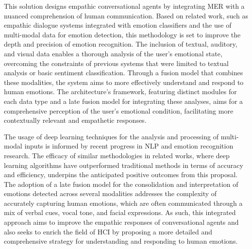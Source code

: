 \documentclass[runningheads]{llncs}
\begin{document}
This solution designs empathic conversational agents by integrating MER with a nuanced comprehension of human communication. Based on related work, such as empathic dialogue systems integrated with emotion classifiers and the use of multi-modal data for emotion detection, this methodology is set to improve the depth and precision of emotion recognition. The inclusion of textual, auditory, and visual data enables a thorough analysis of the user's emotional state, overcoming the constraints of previous systems that were limited to textual analysis or basic sentiment classification. Through a fusion model that combines these modalities, the system aims to more effectively understand and respond to human emotions. The architecture's framework, featuring distinct modules for each data type and a late fusion model for integrating these analyses, aims for a comprehensive perception of the user's emotional condition, facilitating more contextually relevant and empathetic responses.

The usage of deep learning techniques for the analysis and processing of multi-modal inputs is informed by recent progress in NLP and emotion recognition research. The efficacy of similar methodologies in related works, where deep learning algorithms have outperformed traditional methods in terms of accuracy and efficiency, underpins the anticipated positive outcomes from this proposal. The adoption of a late fusion model for the consolidation and interpretation of emotions detected across several modalities addresses the complexity of accurately capturing human emotions, which are often communicated through a mix of verbal cues, vocal tone, and facial expressions. As such, this integrated approach aims to improve the empathic responses of conversational agents and also seeks to enrich the field of HCI by proposing a more detailed and comprehensive strategy for understanding and responding to human emotions.

%
\end{document}
